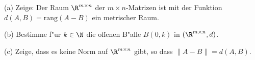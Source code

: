 \begin{prob}
(a) Zeige: Der Raum $\R^{m\times n}$ der $m\times n$-Matrizen ist mit der Funktion $d(A,B)=\text{rang}(A-B)$ ein metrischer Raum.

(b) Bestimme f"ur $k\in\N$ die offenen B"alle $B(0,k)$ in $(\R^{m\times n},d)$.

(c) Zeige, dass es keine Norm auf $\R^{m\times n}$ gibt, so dass $\|A-B\|=d(A,B)$.
\end{prob}
